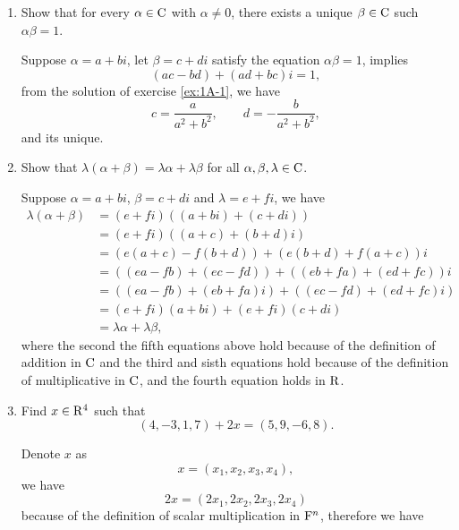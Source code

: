 \begin{enumerate}
\begin{solution}
        \end{solution}
    \item Show that for every $\alpha \in \mathrm{C}$ with $\alpha \neq 0$, there exists a unique $\beta \in \mathrm{C}$ such $\alpha \beta = 1$.
        \begin{solution}
            Suppose $\alpha = a + bi$, let $\beta = c + di$ satisfy the equation $\alpha \beta = 1$, implies
            \[ (ac-bd) + (ad+bc)i = 1, \]
            from the solution of exercise \ref{ex:1A-1}, we have 
            \[ c=\dfrac{a}{a^2 + b^2}, \qquad d=-\dfrac{b}{a^2+b^2}, \]
            and its unique.
        \end{solution}
    \item Show that $\lambda(\alpha + \beta) =\lambda \alpha + \lambda \beta $ for all $\alpha, \beta, \lambda \in \mathrm{C}$.
        \begin{solution}
            Suppose $\alpha = a+bi$, $\beta = c + di$ and $\lambda = e + fi$, we have 
            \begin{align*}
                \lambda (\alpha + \beta) &= (e+fi)( (a+bi) + (c+di)) \\
                                         &= (e+fi)((a+c) + (b+d)i) \\
                                         &= (e(a+c)-f(b+d)) + (e(b+d)+f(a+c))i \\
                                         &= ((ea-fb) + (ec-fd)) + ((eb+fa) + (ed+fc))i\\
                                         &= ((ea-fb) + (eb+fa)i) + ((ec-fd)+(ed+fc)i)\\
                                         &= (e+fi)(a+bi) + (e+fi)(c+di) \\
                                         &= \lambda \alpha + \lambda \beta,
            \end{align*}
            where the second the fifth equations above hold because of the definition of addition in $\mathrm{C}$ and the third and sisth equations hold 
            because of the definition of multiplicative in $\mathrm{C}$, and the fourth equation holds in $\mathrm{R}$.
        \end{solution}
    \item Find $x \in \mathrm{R}^4$ such that 
        \[ (4,-3,1,7) + 2x = (5,9,-6,8).\]
        \begin{solution}
            Denote $x$ as 
            \[ x = (x_1, x_2, x_3, x_4), \]
            we have 
            \[ 2x = (2x_1, 2x_2, 2x_3, 2x_4)\]
            because of the definition of scalar multiplication in $\mathrm{F}^n$, therefore we have 

\end{solution}
\end{enumerate}
